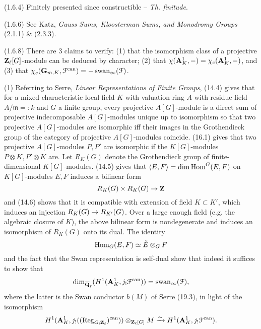 \documentclass[deligne.tex]{subfiles}
\begin{document}
(1.6.4) Finitely presented since constructible – \emph{Th. finitude}.

(1.6.6) See Katz, \emph{Gauss Sums, Kloosterman Sums, and Monodromy Groups} 
(2.1.1) \& (2.3.3).

(1.6.8) There are 3 claims to verify: (1) that the isomorphism class of a
projective $\mathbf{Z}_\ell[G]$-module can be deduced by character; (2) that
$\chi(\mathbf{A}^1_K,-)=\chi_c(\mathbf{A}^1_K,-)$, and (3) that
$\chi_c(\mathbf{G}_{m,K},\mathcal F^{\mathrm{can}})=-\operatorname{swan}_\infty(\mathcal F)$.

(1)
Referring to Serre, \emph{Linear Representations of Finite Groups},
(14.4) gives that for a mixed-characteristic local field $K$ with valuation
ring $A$ with residue field $A/\mathfrak m=:k$ and $G$ a finite group,
every projective $A[G]$-module is a direct sum of projective indecomposable
$A[G]$-modules unique up to isomorphism so that two projective
$A[G]$-modules are isomorphic iff their images in the Grothendieck group of
the category of projective $A[G]$-modules coincide. (16.1) gives that two
projective $A[G]$-modules $P,P'$ are isomorphic if the $K[G]$-modules
$P\otimes K,P'\otimes K$ are.
Let $R_K(G)$ denote the Grothendieck group of finite-dimensional
$K[G]$-modules. (14.5) gives that $\langle E,F\rangle=\dim\operatorname{Hom}^G(E,F)$ on
$K[G]$-modules $E,F$ induces a bilinear form
\begin{equation*}
	R_K(G)\times R_K(G)\rightarrow\mathbf{Z}
\end{equation*}
and (14.6) shows that it is compatible with extension of field
$K\subset K'$, which induces an injection $R_K(G)\rightarrow R_{K'}(G)$.
Over a large enough field (e.g. the algebraic closure of $K$), the above
bilinear form is nondegenerate and induces an isomorphism of $R_K(G)$ onto
its dual. The identity
\begin{equation*}
	\operatorname{Hom}_G(E,F)\simeq\check E\otimes_G F
\end{equation*}
and the fact that the Swan representation is self-dual
\cite[Exp. X (3.8) \& (4.4)]{SGA5} show that indeed it suffices to show
that
\begin{equation*}
	\dim_{\overline{\mathbf{Q}}_\ell}(H^1(\mathbf{A}^1_K,j_!\mathcal F^{\mathrm{can}}))
	=\operatorname{swan}_\infty(\mathcal F),
\end{equation*}
where the latter is the Swan conductor $b(M)$ of Serre (19.3), in light of
the isomorphism
\begin{equation*}
	H^1(\mathbf{A}^1_K,j_!((\operatorname{Reg}_{G;\mathbf{Z}_\ell})^{\mathrm{can}}))\otimes_{\mathbf{Z}_\ell[G]}M\xrightarrow\sim H^1(\mathbf{A}^1_K,j_!\mathcal F^{\mathrm{can}}).
\end{equation*}
\end{document}
